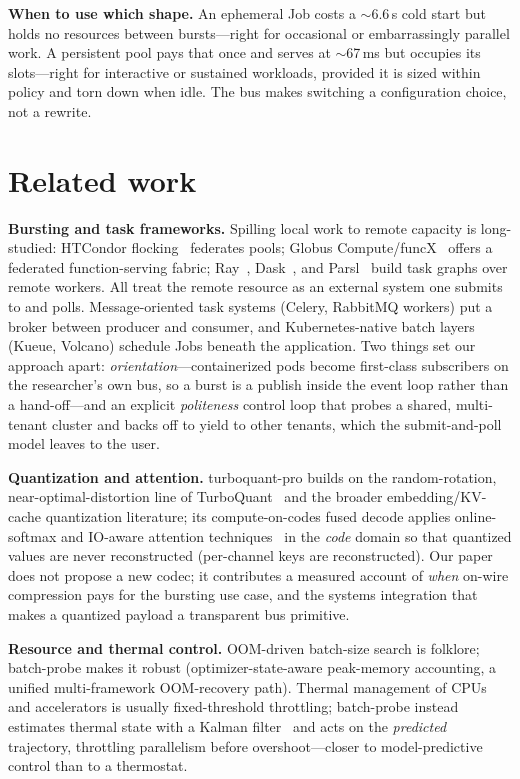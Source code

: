 \documentclass[conference]{IEEEtran}
\begin{document}
\textbf{When to use which shape.} An ephemeral Job costs a $\sim$6.6\,s cold start but holds no
resources between bursts---right for occasional or embarrassingly parallel work. A persistent pool
pays that once and serves at $\sim$67\,ms but occupies its slots---right for interactive or
sustained workloads, provided it is sized within policy and torn down when idle. The bus makes
switching a configuration choice, not a rewrite.

\section{Related work}
\textbf{Bursting and task frameworks.} Spilling local work to remote capacity is long-studied:
HTCondor flocking~\cite{htcondor} federates pools; Globus Compute/funcX~\cite{funcx} offers a
federated function-serving fabric; Ray~\cite{ray}, Dask~\cite{dask}, and Parsl~\cite{parsl} build
task graphs over remote workers. All treat the remote resource as an external system one submits
to and polls. Message-oriented task systems (Celery, RabbitMQ workers) put a broker between
producer and consumer, and Kubernetes-native batch layers (Kueue, Volcano) schedule Jobs beneath
the application. Two things set our approach apart: \emph{orientation}---containerized pods become
first-class subscribers on the researcher's own bus, so a burst is a publish inside the event loop
rather than a hand-off---and an explicit \emph{politeness} control loop that probes a shared,
multi-tenant cluster and backs off to yield to other tenants, which the submit-and-poll model
leaves to the user.

\textbf{Quantization and attention.} turboquant-pro builds on the random-rotation,
near-optimal-distortion line of TurboQuant~\cite{turboquant} and the broader embedding/KV-cache
quantization literature; its compute-on-codes fused decode applies online-softmax and
IO-aware attention techniques~\cite{onlinesoftmax,flashattention} in the \emph{code} domain so that
quantized values are never reconstructed (per-channel keys are reconstructed). Our paper does not propose a new codec; it
contributes a measured account of \emph{when} on-wire compression pays for the bursting use case,
and the systems integration that makes a quantized payload a transparent bus primitive.

\textbf{Resource and thermal control.} OOM-driven batch-size search is folklore; batch-probe makes
it robust (optimizer-state-aware peak-memory accounting, a unified multi-framework OOM-recovery
path). Thermal management of CPUs and accelerators is usually fixed-threshold throttling;
batch-probe instead estimates thermal state with a Kalman filter~\cite{kalman} and acts on the
\emph{predicted} trajectory, throttling parallelism before overshoot---closer to model-predictive
control than to a thermostat.
\end{document}
